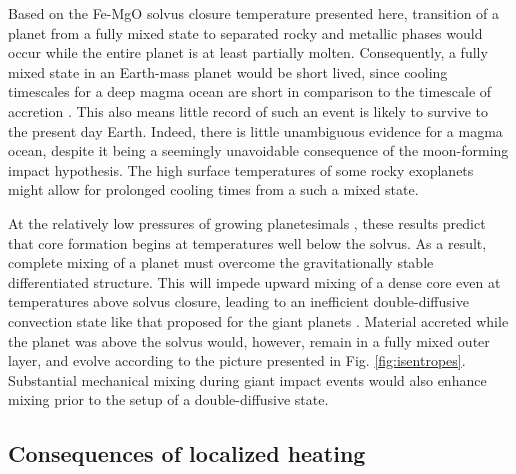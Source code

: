 Based on the Fe-MgO solvus closure temperature presented here, transition of a planet
from a fully mixed state to separated rocky and metallic phases would occur while the entire
planet is at least partially molten. Consequently, a fully mixed state in an Earth-mass
planet would be short lived, since cooling timescales for a deep magma ocean are short in
comparison to the timescale of accretion \citep{Abe1997,Elkins-Tanton2012}. This also
means little record of such an event is likely to survive to the present day Earth. Indeed,
there is little unambiguous evidence for a magma ocean, despite it being a seemingly
unavoidable consequence of the moon-forming impact hypothesis. The high surface
temperatures of some rocky exoplanets \citep{Pepe2013} might allow for prolonged cooling
times from a such a mixed state.

At the relatively low pressures of growing planetesimals
\citep{Kleine2002,Sramek2012,Weiss2013}, these results predict that core formation begins
at temperatures well below the solvus. As a result, complete mixing of a planet must
overcome the gravitationally stable differentiated structure. This will impede upward
mixing of a dense core even at temperatures above solvus closure, leading to an inefficient
double-diffusive convection state like that proposed for the giant planets
\citep{Chabrier2007}. Material accreted while the planet was above the solvus would,
however, remain in a fully mixed outer layer, and evolve according to the picture
presented in Fig. \ref{fig:isentropes}. Substantial mechanical mixing during giant impact
events \citep{Canup2004,Canup2012,Cuk2012} would also enhance mixing prior to the setup of
a double-diffusive state.

\subsection{Consequences of localized heating}

